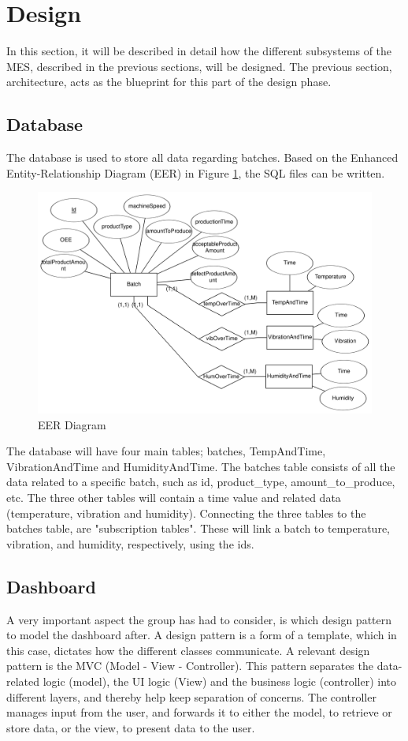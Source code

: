 \section{Design}
In this section, it will be described in detail how the different subsystems of
the MES, described in the previous sections, will be designed. The previous
section, architecture, acts as the blueprint for this part of the design phase.

\subsection{Database}
The database is used to store all data regarding batches. Based on the
Enhanced Entity-Relationship Diagram (EER) in Figure \ref{figure:eer_diagram},
the SQL files can be written.

\begin{figure}[ht]
\centering 
\includegraphics[width=0.8\linewidth]{images/eer_diagrams/database_EER_batch.png}
\caption{EER Diagram} 
\label{figure:eer_diagram}
\end{figure}

The database will have four main tables; batches, TempAndTime, VibrationAndTime and
HumidityAndTime. The batches table consists of all the data related to a
specific batch, such as id, product\_type, amount\_to\_produce, etc. The three
other tables will contain a time value and related data (temperature, vibration
and humidity).
Connecting the three tables to the batches table, are "subscription tables".
These will link a batch to temperature, vibration, and humidity, respectively,
using the ids.

\subsection{Dashboard}
A very important aspect the group has had to consider, is which design pattern
to model the dashboard after. A design pattern is a form of a template, which in
this case, dictates how the different classes communicate. A relevant design
pattern is the MVC (Model - View - Controller). This pattern separates the
data-related logic (model), the UI logic (View) and the business logic 
(controller) into different layers, and thereby help keep separation of
concerns. The controller manages input from the user, and forwards it to either
the model, to retrieve or store data, or the view, to present data to the user.\\

